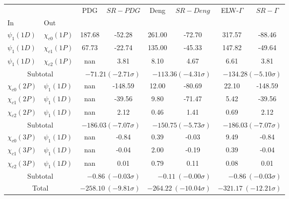 \begin{tabular}{|l|l|c|c|c|c|c|c|}%
\hline%
&&PDG&$SR-PDG$&Deng&$SR-Deng$&ELW-$\Gamma$&$SR-\Gamma$\\%
In&Out&&&&&&\\%
\hline%
$\psi_{1}(1D)$&$\chi_{c0}(1P)$&187.68&-52.28&261.00&-72.70&317.57&-88.46\\%
$\psi_{1}(1D)$&$\chi_{c1}(1P)$&67.73&-22.74&135.00&-45.33&147.82&-49.64\\%
$\psi_{1}(1D)$&$\chi_{c2}(1P)$&nan&3.81&8.10&4.67&6.61&3.81\\%
\hline%
\hline%
\multicolumn{2}{|c|}{Subtotal}&\multicolumn{2}{|r|}{$-71.21 (-2.71\sigma)$}&\multicolumn{2}{|r|}{$-113.36 (-4.31\sigma)$}&\multicolumn{2}{|r|}{$-134.28 (-5.10\sigma)$}\\%
\hline%
\hline%
$\chi_{c0}(2P)$&$\psi_{1}(1D)$&nan&-148.59&12.00&-80.69&22.10&-148.59\\%
$\chi_{c1}(2P)$&$\psi_{1}(1D)$&nan&-39.56&9.80&-71.47&5.42&-39.56\\%
$\chi_{c2}(2P)$&$\psi_{1}(1D)$&nan&2.12&0.46&1.41&0.69&2.12\\%
\hline%
\hline%
\multicolumn{2}{|c|}{Subtotal}&\multicolumn{2}{|r|}{$-186.03 (-7.07\sigma)$}&\multicolumn{2}{|r|}{$-150.75 (-5.73\sigma)$}&\multicolumn{2}{|r|}{$-186.03 (-7.07\sigma)$}\\%
\hline%
\hline%
$\chi_{c0}(3P)$&$\psi_{1}(1D)$&nan&-0.84&0.39&-0.03&9.49&-0.84\\%
$\chi_{c1}(3P)$&$\psi_{1}(1D)$&nan&-0.04&2.00&-0.19&0.39&-0.04\\%
$\chi_{c2}(3P)$&$\psi_{1}(1D)$&nan&0.01&0.79&0.11&0.08&0.01\\%
\hline%
\hline%
\multicolumn{2}{|c|}{Subtotal}&\multicolumn{2}{|r|}{$-0.86~(-0.03\sigma)$}&\multicolumn{2}{|r|}{$-0.11~(-0.00\sigma)$}&\multicolumn{2}{|r|}{$-0.86~(-0.03\sigma)$}\\%
\hline%
\hline%
\multicolumn{2}{|c|}{Total}&\multicolumn{2}{|r|}{$-258.10~(-9.81\sigma)$}&\multicolumn{2}{|r|}{$-264.22~(-10.04\sigma)$}&\multicolumn{2}{|r|}{$-321.17~(-12.21\sigma)$}\\%
\hline%
\end{tabular}